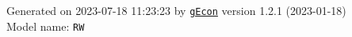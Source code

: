 \documentclass[10pt,a4paper]{article}
\numberwithin{equation}{section}
\begin{document}
\begin{landscape}
\begin{flushleft}{\large
Generated  on 2023-07-18 11:23:23 by \href{http://gecon.r-forge.r-project.org/}{\texttt{gEcon}} version 1.2.1 (2023-01-18)\\
Model name: \verb+RW+
}\end{flushleft}


\end{landscape}

\end{document}
